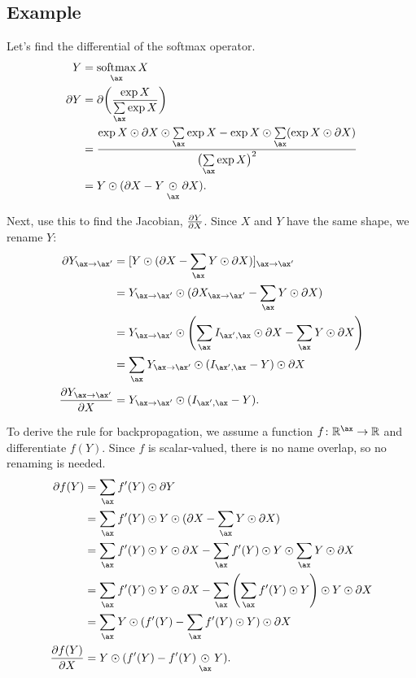 \subsection{Example}

Let's find the differential of the softmax operator.
\begin{align*}
  Y &= \nfun{\ax}{softmax} X \\
  \partial Y &= \partial \biggl(\frac{\exp X}{\nsum{\ax} \exp X}\biggr) \\
    &= \frac{\exp X \odot \partial X \odot \nsum{\ax} \exp X - \exp X \odot \nsum{\ax} (\exp X \odot \partial X)}{\bigl(\nsum{\ax} \exp X\bigr)^2} \\
  &= Y \odot (\partial X - Y \ndot{\ax} \partial X).
\end{align*}

Next, use this to find the Jacobian, $\frac{\partial Y}{\partial X}$. Since $X$ and $Y$ have the same shape, we rename $Y$:
\begin{align*}
  \partial Y_{\ax\rightarrow\ax'} &= [Y \odot (\partial X - \nsum{\ax} Y \odot \partial X)]_{\ax\rightarrow\ax'} \\
  &= Y_{\ax\rightarrow\ax'} \odot (\partial X_{\ax\rightarrow\ax'} - \nsum{\ax} Y \odot \partial X) \\
  &= Y_{\ax\rightarrow\ax'} \odot \left(\nsum{\ax} I_{\ax',\ax} \odot \partial X - \nsum{\ax} Y \odot \partial X\right) \\
  &= \nsum{\ax} Y_{\ax\rightarrow\ax'} \odot (I_{\ax',\ax} - Y) \odot \partial X \\
  \ddx {Y_{\ax\rightarrow\ax'}} &= Y_{\ax\rightarrow\ax'} \odot (I_{\ax',\ax} - Y).
\end{align*}

To derive the rule for backpropagation, we assume a function $f \colon \reals^\ax \rightarrow \reals$ and differentiate $f(Y)$. Since $f$ is scalar-valued, there is no name overlap, so no renaming is needed.
\begin{align*}
  \partial f(Y) &= \nsum{\ax} f'(Y) \odot \partial Y \\
  &= \nsum{\ax} f'(Y) \odot Y \odot (\partial X - \nsum{\ax} Y \odot \partial X) \\
  &= \nsum{\ax} f'(Y) \odot Y \odot \partial X - \nsum{\ax} f'(Y) \odot Y \odot \nsum{\ax} Y \odot \partial X \\
  &= \nsum{\ax} f'(Y) \odot Y \odot \partial X - \nsum{\ax} \left(\nsum{\ax} f'(Y) \odot Y\right) \odot Y \odot \partial X \\
  &= \nsum{\ax} Y \odot (f'(Y) - \nsum{\ax} f'(Y) \odot Y) \odot \partial X \\
  \ddx{f(Y)} &= Y \odot (f'(Y) - f'(Y) \ndot{\ax} Y).
\end{align*}

